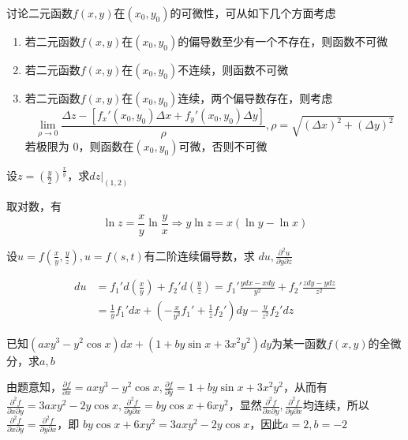 \documentclass{article}
\begin{document}
\begin{remark}
讨论二元函数\(f(x,y)\)在\((x_0,y_0)\)的可微性，可从如下几个方面考虑
\begin{enumerate}
\item 若二元函数\(f(x,y)\)在\((x_0,y_0)\)的偏导数至少有一个不存在，则函数不可微
\item 若二元函数\(f(x,y)\)在\((x_0,y_0)\)不连续，则函数不可微
\item 若二元函数\(f(x,y)\)在\((x_0,y_0)\)连续，两个偏导数存在，则考虑
\begin{equation*}
\lim_{\rho\to0}\frac{\Delta z-[f_x'(x_0,y_0)\Delta x+f_y'(x_0,y_0)\Delta y]}{\rho},
\rho=\sqrt{(\Delta x)^2+(\Delta y)^2}
\end{equation*}
若极限为 0，则函数在\((x_0,y_0)\)可微，否则不可微
\end{enumerate}
\end{remark}

\begin{examplle}[]
设\(z=(\frac{y}{2})^{\frac{x}{y}}\)，求\(dz\Big\rvert_{(1,2)}\)

取对数，有
\begin{equation*}
\ln z=\frac{x}{y}\ln\frac{y}{x}\Rightarrow
y\ln z=x(\ln y-\ln x)
\end{equation*}
\end{examplle}


\begin{examplle}[]
设\(u=f(\frac{x}{y},\frac{y}{z}),u=f(s,t)\)有二阶连续偏导数，求
\(du,\frac{\partial^2 u}{\partial y\partial z}\)

\begin{align*}
du&=f_1'd(\frac{x}{y})+f_2'd(\frac{y}{z})=f_1'\frac{ydx-xdy}{y^2}
+f_2'\frac{zdy-ydz}{z^2}\\
&=\frac{1}{y}f_1'dx+(-\frac{x}{y^2}f_1'+\frac{1}{z}f_2')dy-\frac{y}{z^2}f_2'dz
\end{align*}
\end{examplle}

\begin{examplle}[]
已知\((axy^3-y^2\cos x)dx+(1+by\sin x+3x^2y^2)dy\)为某一函数\(f(x,y)\)的全微
分，求\(a,b\)

由题意知，\(\frac{\partial f}{\partial x}=axy^3-y^2\cos x,\frac{\partial f}{\partial y}=1+by\sin
   x+3x^2y^2\)，从而有
\(\frac{\partial ^2f}{\partial x\partial y}=3axy^2-2y\cos x,\frac{\partial^2f}{\partial y\partial
   x}=by\cos x+6xy^2\)，显然\(\frac{\partial^2f}{\partial x\partial y},\frac{\partial^2f}{\partial y\partial
   x}\)均连续，所以\(\frac{\partial^2f}{\partial x\partial y}=\frac{\partial^2f}{\partial y\partial x}\)，即
\(by\cos x+6xy^2=3axy^2-2y\cos x\)，因此\(a=2,b=-2\)
\end{examplle}
\end{document}
